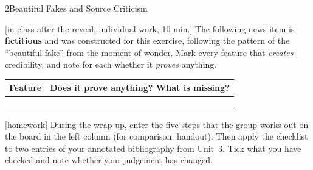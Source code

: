 \begin{uebungsblattb}{2}{Beautiful Fakes and Source Criticism}

[in class after the reveal, individual work, 10 min.]
The following news item is \textbf{fictitious} and was constructed for
this exercise, following the pattern of the \enquote{beautiful fake} from
the moment of wonder. Mark every feature that \emph{creates} credibility,
and note for each whether it \emph{proves} anything.

\begin{center}
\end{center}

\begin{center}
\renewcommand{\arraystretch}{1.9}
\begin{tabular}{|p{}|p{}|}
\hline
\textbf{Feature} & \textbf{Does it prove anything? What is missing?} \\
\hline
 & \\ \hline
 & \\ \hline
 & \\ \hline
 & \\ \hline
\end{tabular}
\end{center}

[homework]
During the wrap-up, enter the five steps that the group works out on the
board in the left column (for comparison: handout). Then apply the
checklist to two entries of your annotated bibliography from Unit~3. Tick
what you have checked and note whether your judgement has changed.


\end{uebungsblattb}

